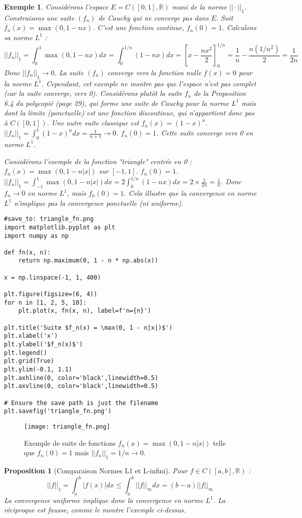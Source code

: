 \documentclass{article}
\newtheorem{proposition}[theorem]{Proposition}
\newtheorem{example}{Exemple}
\begin{document}
\begin{example}
Considérons l'espace $E = C([0, 1], \mathbb{R})$ muni de la norme $||\cdot||_1$. Construisons une suite $(f_n)$ de Cauchy qui ne converge pas dans $E$.
Soit $f_n(x) = \max(0, 1-nx)$. C'est une fonction continue, $f_n(0)=1$.
Calculons sa norme $L^1$ :
\[
||f_n||_1 = \int_0^1 \max(0, 1-nx) dx = \int_0^{1/n} (1-nx) dx = \left[ x - \frac{nx^2}{2} \right]_0^{1/n} = \frac{1}{n} - \frac{n(1/n^2)}{2} = \frac{1}{2n}
\]
Donc $||f_n||_1 \to 0$. La suite $(f_n)$ converge vers la fonction nulle $f(x)=0$ pour la norme $L^1$.
Cependant, cet exemple ne montre pas que l'espace n'est pas complet (car la suite converge, vers 0).
Considérons plutôt la suite $f_n$ de la Proposition 6.4 du polycopié (page 29), qui forme une suite de Cauchy pour la norme $L^1$ mais dont la limite (ponctuelle) est une fonction discontinue, qui n'appartient donc pas à $C([0,1])$.
Une autre suite classique est $f_n(x) = (1-x)^n$. $||f_n||_1 = \int_0^1 (1-x)^n dx = \frac{1}{n+1} \to 0$. $f_n(0)=1$. Cette suite converge vers 0 en norme $L^1$.

Considérons l'exemple de la fonction "triangle" centrée en 0 : $f_n(x) = \max(0, 1-n|x|)$ sur $[-1, 1]$. $f_n(0)=1$.
$||f_n||_1 = \int_{-1}^1 \max(0, 1-n|x|) dx = 2 \int_0^{1/n} (1-nx) dx = 2 \times \frac{1}{2n} = \frac{1}{n}$.
Donc $f_n \to 0$ en norme $L^1$, mais $f_n(0)=1$. Cela illustre que la convergence en norme $L^1$ n'implique pas la convergence ponctuelle (ni uniforme).
\end{example}
\begin{verbatim}
#save_to: triangle_fn.png
import matplotlib.pyplot as plt
import numpy as np

def fn(x, n):
    return np.maximum(0, 1 - n * np.abs(x))

x = np.linspace(-1, 1, 400)

plt.figure(figsize=(6, 4))
for n in [1, 2, 5, 10]:
    plt.plot(x, fn(x, n), label=f'n={n}')

plt.title('Suite $f_n(x) = \max(0, 1 - n|x|)$')
plt.xlabel('x')
plt.ylabel('$f_n(x)$')
plt.legend()
plt.grid(True)
plt.ylim(-0.1, 1.1)
plt.axhline(0, color='black',linewidth=0.5)
plt.axvline(0, color='black',linewidth=0.5)

# Ensure the save path is just the filename
plt.savefig('triangle_fn.png')
\end{verbatim}

\begin{figure}[H]
\centering
\texttt{[image: triangle\_fn.png]}
\caption{Exemple de suite de fonctions $f_n(x) = \max(0, 1-n|x|)$ telle que $f_n(0)=1$ mais $||f_n||_1 = 1/n \to 0$.}
\label{fig:triangle_fn}
\end{figure}

\begin{proposition}[Comparaison Normes L1 et L-infini]
Pour $f \in C([a, b], \mathbb{R})$ :
\[
||f||_1 = \int_a^b |f(x)| dx \le \int_a^b ||f||_\infty dx = (b-a) ||f||_\infty
\]
La convergence uniforme implique donc la convergence en norme $L^1$. La réciproque est fausse, comme le montre l'exemple ci-dessus.
\end{proposition}
\end{document}

